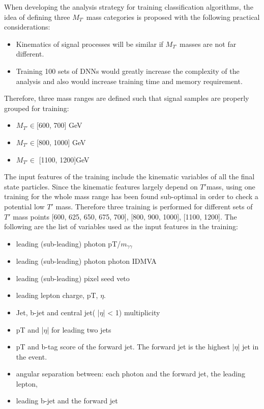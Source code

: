 When developing the analysis strategy for training classification algorithms, the idea of defining three $M_{T’}$ mass categories is proposed with the following practical considerations:
\begin{itemize}
    \item Kinematics of signal processes will be similar if $M_{T’}$ masses are not far different.
    \item Training 100 sets of DNNs would greatly increase the complexity of the analysis and also would increase training time and memory requirement.
\end{itemize}

Therefore, three mass ranges are defined such that signal samples are properly grouped for training:
\begin{itemize}
    \item $M_{T'} \in $[600, 700] GeV
    \item $M_{T'} \in $[800, 1000] GeV
    \item $M_{T'}   \in$ [1100, 1200]GeV
\end{itemize}


The input features of the training include the kinematic variables of all the final state particles. Since the kinematic features largely depend on $T'$mass, using one training for the whole mass range has been found sub-optimal in order to check a potential low $T'$ mass. Therefore three training is performed for different sets of $T'$ mass points [600, 625, 650, 675, 700], [800, 900, 1000], [1100, 1200]. The following are the list of variables used as the input features in the
training:
\begin{itemize}
    \item leading (sub-leading) photon pT/$m_{\gamma\gamma}$
    \item leading (sub-leading) photon photon IDMVA
    \item leading (sub-leading) pixel seed veto
    \item leading lepton charge, pT, $\eta$.
    \item Jet, b-jet and central jet( |$\eta$| < 1) multiplicity
    \item pT and |$\eta$| for leading two jets
    \item pT and b-tag score of the forward jet. The forward jet is the highest |$\eta$| jet in the event.
    \item angular separation between: each photon and the forward jet, the leading lepton,
\item leading b-jet and the forward jet
\end{itemize}


